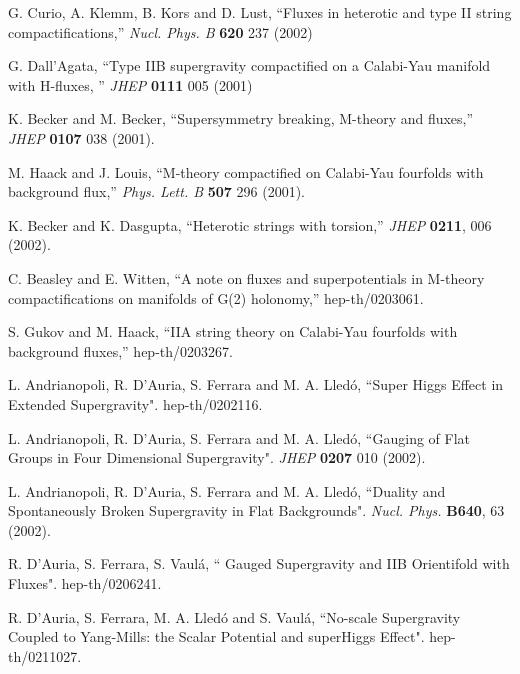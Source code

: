 \documentclass[a4paper,12pt]{article}
\begin{document}
\begin{thebibliography}{99}
 G. Curio, A. Klemm, B. Kors and D. Lust,
``Fluxes in heterotic and type II string compactifications,'' {\it Nucl.  Phys.  B }
 {\bf 620} 237 (2002)



 G. Dall'Agata, ``Type IIB supergravity compactified on a Calabi-Yau manifold with H-fluxes,
'' {\it JHEP} {\bf 0111} 005 (2001)


 K. Becker and M. Becker,
``Supersymmetry breaking, M-theory and fluxes,'' {\it JHEP} {\bf
0107} 038 (2001).


 M. Haack and J. Louis,
``M-theory compactified on Calabi-Yau fourfolds with background
flux,'' {\it Phys.  Lett. B} {\bf 507} 296 (2001).


K. Becker and K. Dasgupta, ``Heterotic strings with torsion,''
{\it JHEP} {\bf 0211}, 006 (2002).


















 C. Beasley and E. Witten,
``A note on fluxes and superpotentials in M-theory
compactifications on manifolds of G(2) holonomy,'' hep-th/0203061.


 S. Gukov and M. Haack,
``IIA string theory on Calabi-Yau fourfolds with background
fluxes,'' hep-th/0203267.

 L. Andrianopoli, R. D'Auria, S. Ferrara and M. A. Lled\'o,
``Super Higgs Effect in Extended Supergravity". hep-th/0202116.

 L. Andrianopoli, R. D'Auria, S. Ferrara and M. A. Lled\'o, ``Gauging of Flat
Groups in Four Dimensional Supergravity". {\it JHEP} {\bf 0207}
010 (2002).

 L. Andrianopoli, R. D'Auria, S. Ferrara and M. A. Lled\'o, ``Duality and
Spontaneously Broken Supergravity in Flat Backgrounds". {\it
Nucl. Phys. } {\bf B640}, 63 (2002).






 R. D'Auria, S. Ferrara, S. Vaul\'a, ``\coordHE{} Gauged Supergravity and IIB
Orientifold with Fluxes". hep-th/0206241.

 R. D'Auria, S. Ferrara, M. A. Lled\'o and  S.
Vaul\'a, ``No-scale \coordHE{} Supergravity Coupled to Yang-Mills: the
Scalar Potential and superHiggs Effect". hep-th/0211027.


\end{thebibliography}
\end{document}
